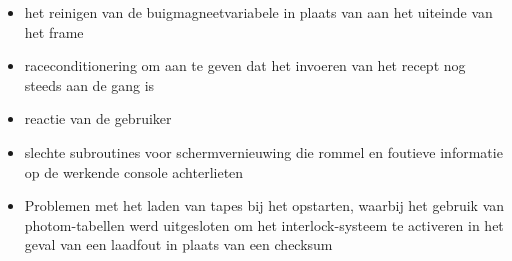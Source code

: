 \documentclass{article}
\begin{document}
	
	\begin{itemize}
		\item  het reinigen van de buigmagneetvariabele in plaats van aan het uiteinde van het frame
		\item  raceconditionering om aan te geven dat het invoeren van het recept nog steeds aan de gang is
		\item  reactie van de gebruiker
		\item  slechte subroutines voor schermvernieuwing die rommel en foutieve informatie op de werkende console achterlieten
		\item  Problemen met het laden van tapes bij het opstarten, waarbij het gebruik van photom-tabellen werd uitgesloten om het interlock-systeem te activeren in het geval van een laadfout in plaats van een checksum
	\end{itemize}
	
\end{document}
